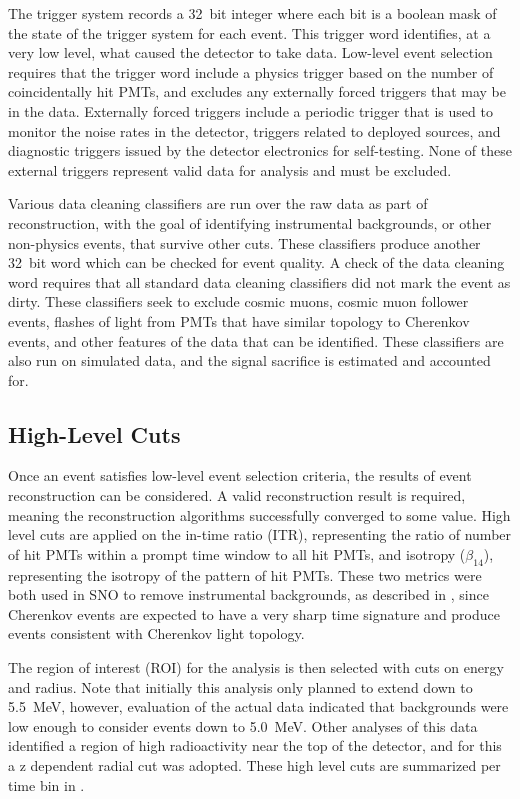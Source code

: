 The {\snop} trigger system records a 32~bit integer where each bit is a boolean mask of the state of the trigger system for each event.
This trigger word identifies, at a very low level, what caused the detector to take data.
Low-level event selection requires that the trigger word include a physics trigger based on the number of coincidentally hit PMTs, and excludes any externally forced triggers that may be in the data.
Externally forced triggers include a periodic trigger that is used to monitor the noise rates in the detector, triggers related to deployed sources, and diagnostic triggers issued by the detector electronics for self-testing.
None of these external triggers represent valid data for analysis and must be excluded.

Various data cleaning classifiers are run over the raw data as part of reconstruction, with the goal of identifying instrumental backgrounds, or other non-physics events, that survive other cuts.
These classifiers produce another 32~bit word which can be checked for event quality.
A check of the data cleaning word requires that all standard data cleaning classifiers did not mark the event as dirty.
These classifiers seek to exclude cosmic muons, cosmic muon follower events, flashes of light from PMTs that have similar topology to Cherenkov events, and other features of the data that can be identified.
These classifiers are also run on simulated data, and the signal sacrifice is estimated and accounted for. 

\subsection{High-Level Cuts}

Once an event satisfies low-level event selection criteria, the results of event reconstruction can be considered.
A valid reconstruction result is required, meaning the reconstruction algorithms successfully converged to some value.
High level cuts are applied on the in-time ratio (ITR), representing the ratio of number of hit PMTs within a prompt time window to all hit PMTs, and isotropy ($\beta_{14}$), representing the isotropy of the pattern of hit PMTs.
These two metrics were both used in SNO to remove instrumental backgrounds, as described in , since Cherenkov events are expected to have a very sharp time signature and produce events consistent with Cherenkov light topology.

The region of interest (ROI) for the analysis is then selected with cuts on energy and radius.
Note that initially this analysis only planned to extend down to 5.5~MeV, however, evaluation of the actual data indicated that backgrounds were low enough to consider events down to 5.0~MeV.
Other analyses of this data identified a region of high radioactivity near the top of the detector, and for this a z dependent radial cut was adopted.
These high level cuts are summarized per time bin in .

